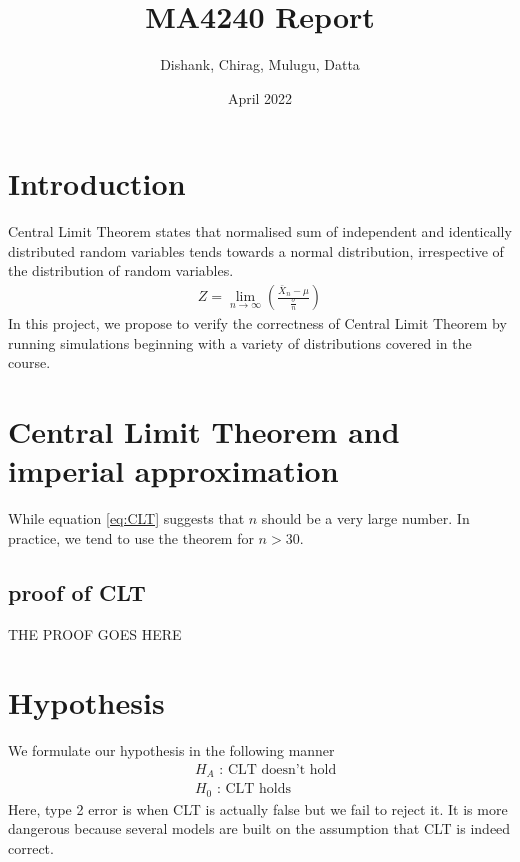 \documentclass{article}
\title{MA4240 Report}
\author{Dishank, Chirag, Mulugu, Datta}
\date{April 2022}
\begin{document}
\maketitle

\section{Introduction}
Central Limit Theorem states that normalised sum of independent and identically distributed random variables tends towards a normal distribution, irrespective of the distribution of random variables.
\begin{align}
    Z = \lim_{n \to \infty} \left(\frac{\bar{X}_n-\mu}{\frac{\sigma}{n}}\right) \label{eq:CLT}
\end{align}
In this project, we propose to verify the correctness of Central Limit Theorem by running simulations beginning with a variety of distributions covered in the course.

\section{Central Limit Theorem and imperial approximation}
While equation \eqref{eq:CLT} suggests that $n$ should be a very large number. In practice, we tend to use the theorem for $n>30$. 
\subsection{proof of CLT}
THE PROOF GOES HERE

\section{Hypothesis}
We formulate our hypothesis in the following manner
\begin{align}
    & H_A\text{ : CLT doesn't hold} \nonumber\\
    & H_0\text{ : CLT holds}\nonumber
\end{align}
Here, type 2 error is when CLT is actually false but we fail to reject it. It is more dangerous because several models are built on the assumption that CLT is indeed correct.
\end{document}

